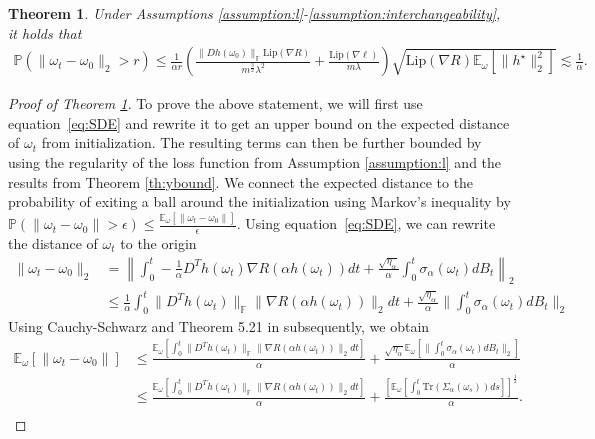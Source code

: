 \documentclass[10pt]{article} %
\def\eqref#1{equation~\ref{#1}}
\newcommand{\bE}{\mathbb{E}}
\newcommand{\bF}{\mathbb{F}}
\newcommand{\bP}{\mathbb{P}}
\newtheorem{theorem}{Theorem}
\begin{document}
\begin{theorem}\label{thm:omegaBound}
    Under Assumptions \ref{assumption:l}-\ref{assumption:interchangeability}, it holds that
    \begin{align}\label{eq:omegabound}
        \bP(\|\omega_t-\omega_0\|_2>r)\leq\frac{1}{\alpha r}\left(\frac{\|Dh(\omega_0)\|_\bF \mathrm{Lip}(\nabla R)}{m^{\frac{3}{2}}\lambda^2}+\frac{\mathrm{Lip}(\nabla \ell)}{m\lambda}{}\right)\sqrt{\mathrm{Lip}(\nabla R)\bE_\omega [\|h^\star\|^2_2]}\lesssim \frac{1}{\alpha}.
    \end{align}
\end{theorem}
\begin{proof}[Proof of Theorem \ref{thm:omegaBound}]
    To prove the above statement, we will first use \eqref{eq:SDE} and rewrite it to get an upper bound on the expected distance of $\omega_t$ from initialization. The resulting terms can then be further bounded by using the regularity of the loss function from Assumption \ref{assumption:l} and the results from Theorem \ref{th:ybound}. We connect the expected distance to the probability of exiting a ball around the initialization using Markov's inequality by $\bP(\|\omega_t-\omega_0\|>\epsilon)\leq \frac{\bE_\omega[\|\omega_t-\omega_0\|]}{\epsilon}$. Using \eqref{eq:SDE}, we can rewrite the distance of $\omega_t$ to the origin
    \begin{align*}
        \|\omega_t-\omega_0\|_2&=\left\|\int_0^t-\frac{1}{\alpha}D^Th(\omega_t)\nabla R(\alpha h(\omega_t))dt+\frac{\sqrt{\eta_\alpha}}{\alpha}\int_0^t\sigma_\alpha(\omega_t)dB_t\right\|_2\\
        &\leq \frac{1}{\alpha}\int_0^t\|D^Th(\omega_t)\|_\bF\|\nabla R(\alpha h(\omega_t))\|_2dt+\frac{\sqrt{\eta_\alpha}}{\alpha}\|\int_0^t\sigma_\alpha(\omega_t) dB_t\|_2
    \end{align*}
    Using Cauchy-Schwarz and Theorem 5.21 in \citet{mao2007stochastic} subsequently, we obtain
    \begin{align*}
        \bE_\omega[\|\omega_t-\omega_0\|] &\leq \frac{\bE_\omega[\int_0^t\|D^Th(\omega_t)\|_\bF\|\nabla R(\alpha h(\omega_t))\|_2dt]}{\alpha}+\frac{\sqrt{\eta_\alpha}\bE_\omega[\|\int_0^t\sigma_\alpha(\omega_t) dB_t\|_2]}{\alpha}\\
        &\leq \frac{\bE_\omega[\int_0^t\|D^Th(\omega_t)\|_\bF\|\nabla R(\alpha h(\omega_t))\|_2dt]}{\alpha}+\frac{\left[\bE_\omega[\int_0^t\mathrm{Tr}(\Sigma_\alpha(\omega_s))ds]\right]^\frac{1}{2}}{\alpha}.\\
    \end{align*}

\end{proof}
\end{document}
